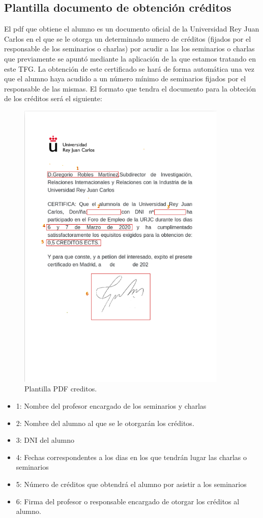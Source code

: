 \documentclass[a4paper, 12pt]{book}
\begin{document}
\subsection{Plantilla documento de obtención créditos}
	El pdf que obtiene el alumno es un documento oficial de la Universidad Rey Juan Carlos en el que se le otorga un determinado numero de créditos (fijados por el responsable de los seminarios o charlas) por acudir a las los seminarios o charlas que previamente se apuntó mediante la aplicación de la que estamos tratando en este TFG. La obtención de este certificado se hará de forma automática una vez que el alumno haya acudido a un número mínimo de seminarios fijados por el responsable de las mismas. 
	El formato que tendra el documento para la obteción de los créditos será el siguiente:
	
\begin{figure}[H]
  \centering
  \includegraphics[width=10cm, keepaspectratio]{img/certificadoCreditos.png}
  \caption{Plantilla PDF creditos.}\label{fig:pdfcreditos}
\end{figure}

\begin{itemize}
		\item 1: Nombre del profesor encargado de los seminarios y charlas
		\item 2: Nombre del alumno al que se le otorgarán los créditos.
		\item 3: DNI del alumno
		\item 4: Fechas correspondentes a los dias en los que tendrán lugar las charlas o seminarios
		\item 5: Número de créditos que obtendrá el alumno por asistir a los seminarios
		\item 6: Firma del profesor o responsable encargado de otorgar los créditos al alumno.
		\end{itemize}
\end{document}
